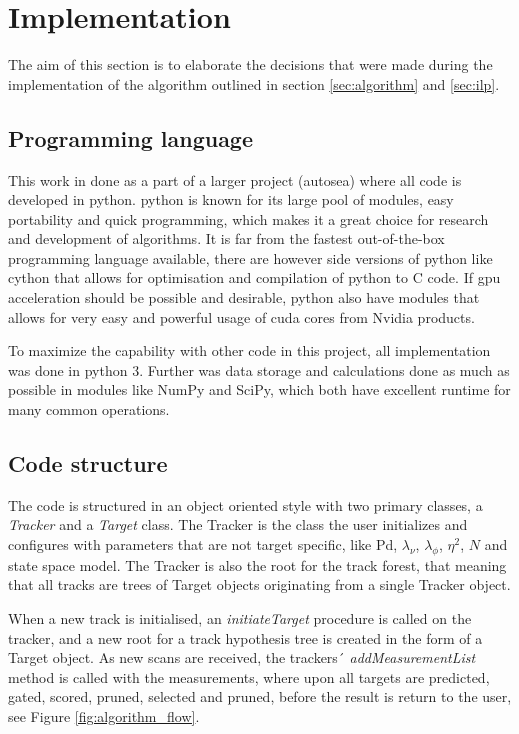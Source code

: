 \section{Implementation}
\label{sec:implementation}
The aim of this section is to elaborate the decisions that were made during the implementation of the algorithm outlined in section \ref{sec:algorithm} and \ref{sec:ilp}.

\subsection{Programming language}
This work in done as a part of a larger project (\gls{autosea}) where all code is developed in \gls{python}. \Gls{python} is known for its large pool of modules, easy portability and quick programming, which makes it a great choice for research and development of algorithms. It is far from the fastest out-of-the-box programming language available, there are however side versions of python like \gls{cython} that allows for optimisation and compilation of \gls{python} to C code. If \gls{gpu} acceleration should be possible and desirable, \gls{python} also have modules that allows for very easy and powerful usage of \gls{cuda} cores from Nvidia products.

To maximize the capability with other code in this project, all implementation was done in \gls{python} 3. Further was data storage and calculations done as much as possible in modules like NumPy and SciPy, which both have excellent runtime for many common operations. 

\subsection{Code structure}
The code is structured in an object oriented style with two primary classes, a \emph{Tracker} and a \emph{Target} class. The Tracker is the class the user initializes and configures with parameters that are not target specific, like \gls{Pd}, $\lambda_\nu$, $\lambda_\phi$, $\eta^2$, $N$ and state space model. The Tracker is also the root for the track forest, that meaning that all tracks are trees of Target objects originating from a single Tracker object.

When a new track is initialised, an \emph{initiateTarget} procedure is called on the tracker, and a new root for a \gls{track hypothesis tree} is created in the form of a Target object. As new \glspl{scan} are received, the trackers´ \emph{addMeasurementList} method is called with the measurements, where upon all \glspl{target} are predicted, gated, scored, pruned, selected and pruned, before the result is return to the user, see Figure \ref{fig:algorithm_flow}.

